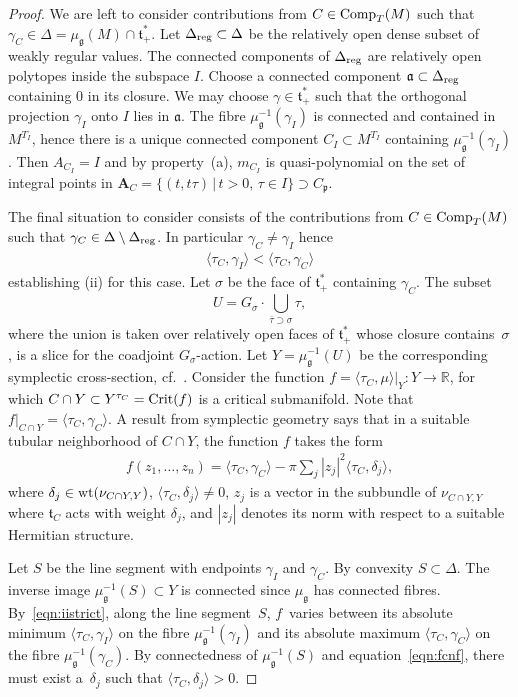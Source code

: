 \documentclass[11pt]{article}
\numberwithin{equation}{section}
\newcommand{\pair}[2]{\langle #1, #2 \rangle}
\newcommand{\ol}[1]{\overline{#1}}
\newcommand{\tn}[1]{\textnormal{#1}}
\def\g{\ensuremath{\mathfrak{g}}}
\def\t{\ensuremath{\mathfrak{t}}}
\def\a{\ensuremath{\mathfrak{a}}}
\def\p{\ensuremath{\mathfrak{p}}}
\def\bR{\ensuremath{\mathbb{R}}}
\begin{document}
\begin{proof}
We are left to consider contributions from $C \in \tn{Comp}_T(M)$ such that $\gamma_C \in \Delta=\mu_\g(M)\cap \t_+^\ast$. Let $\Delta_{\tn{reg}} \subset \Delta$ be the relatively open dense subset of weakly regular values. The connected components of $\Delta_{\tn{reg}}$ are relatively open polytopes inside the subspace $I$. Choose a connected component $\a \subset \Delta_{\tn{reg}}$ containing $0$ in its closure. We may choose $\gamma \in \t^\ast_+$ such that the orthogonal projection $\gamma_I$ onto $I$ lies in $\a$. The fibre $\mu_\g^{-1}(\gamma_I)$ is connected and contained in $M^{T_I}$, hence there is a unique connected component $C_I \subset M^{T_I}$ containing $\mu_\g^{-1}(\gamma_I)$. Then $A_{C_I}=I$ and by property~(a), $m_{C_I}$ is quasi-polynomial on the set of integral points in $\bm{A}_C=\{(t,t\tau)\,|\,t>0,\,\tau \in I\} \supset C_\p$.

The final situation to consider consists of the contributions from $C \in \tn{Comp}_T(M)$ such that $\gamma_C \in \Delta \setminus \Delta_{\tn{reg}}$. In particular $\gamma_C \ne \gamma_I$ hence
\begin{gather}\label{eqn:iistrict}
\pair{\tau_C}{\gamma_I}<\pair{\tau_C}{\gamma_C}
\end{gather}
establishing (ii) for this case. Let $\sigma$ be the face of $\t^\ast_+$ containing $\gamma_C$. The subset
\[ U=G_\sigma\cdot \bigcup_{\ol{\tau}\supset \sigma} \tau, \]
where the union is taken over relatively open faces of $\t^\ast_+$ whose closure contains~$\sigma$, is a slice for the coadjoint $G_\sigma$-action. Let $Y=\mu_\g^{-1}(U)$ be the corresponding symplectic cross-section, cf.\ \cite[Remark~3.7, Theorem~3.8]{ConvexitySympCuts}. Consider the function $f=\pair{\tau_C}{\mu}|_Y \colon Y \rightarrow \bR$, for which $C \cap Y \subset Y^{\tau_C}=\tn{Crit}(f)$ is a critical submanifold. Note that $f|_{C\cap Y}=\pair{\tau_C}{\gamma_C}$. A result from symplectic geometry says that in a suitable tubular neighborhood of $C \cap Y$, the function $f$ takes the form
\begin{gather}\label{eqn:fcnf}
f(z_1,\dots,z_n)=\pair{\tau_C}{\gamma_C}-\pi \sum_j |z_j|^2\pair{\tau_C}{\delta_j},
\end{gather}
where $\delta_j \in \tn{wt}(\nu_{C\cap Y,Y})$, $\pair{\tau_C}{\delta_j}\ne 0$, $z_j$ is a vector in the subbundle of $\nu_{C\cap Y,Y}$ where $\t_C$ acts with weight $\delta_j$, and $|z_j|$ denotes its norm with respect to a suitable Hermitian structure.

Let $S$ be the line segment with endpoints $\gamma_I$ and $\gamma_C$. By convexity $S \subset \Delta$. The inverse image $\mu_\g^{-1}(S) \subset Y$ is connected since $\mu_\g$ has connected fibres. By~\eqref{eqn:iistrict}, along the line segment~$S$, $f$~varies between its absolute minimum $\pair{\tau_C}{\gamma_I}$ on the fibre $\mu_\g^{-1}(\gamma_I)$ and its absolute maximum $\pair{\tau_C}{\gamma_C}$ on the fibre $\mu_\g^{-1}(\gamma_C)$. By connectedness of $\mu_\g^{-1}(S)$ and equation~\eqref{eqn:fcnf}, there must exist a~$\delta_j$ such that $\pair{\tau_C}{\delta_j}>0$.


\end{proof}
\end{document}

